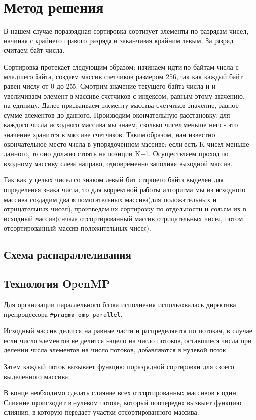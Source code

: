 \documentclass{report}
\begin{document}
\newpage

\section*{Метод решения}
В нашем случае поразрядная сортировка сортирует элементы по разрядам чисел, начиная с крайнего правого разряда и заканчивая крайним левым. За разряд считаем байт числа.
\par Сортировка протекает следующим образом: начинаем идти по байтам числа с младшего байта, создаем массив счетчиков размером 256, так как каждый байт равен числу от 0 до 255. Смотрим значение текущего байта числа и и увеличиваем элемент в массиве счетчиков с индексом, равным этому значению, на единицу. Далее присваиваем элементу массива счетчиков значение, равное сумме элементов до данного. Производим окончательную расстановку: для каждого числа исходного массива мы знаем, сколько чисел меньше него - это значение хранится в массиве счетчиков. Таким образом, нам известно окончательное место числа в упорядоченном массиве: если есть K чисел меньше данного, то оно должно стоять на позиции K+1. Осуществляем проход по входному массиву слева направо, одновременно заполняя выходной массив.
\par Так как у целых чисел со знаком левый бит старшего байта выделен для определения знака числа, то для корректной работы алгоритма мы из исходного массива создадим два вспомогательных массива(для положительных и отрицательных чисел), произведем их сортировку по отдельности и сольем их в исходный массив(снчала отсортированный массив отрицательных чисел, потом отсортированный массив положительных чисел).
\newpage
\begin{center}\section*{Схема распараллеливания}\end{center}
\subsection*{Технология OpenMP}
Для организации параллельного блока исполнения использовалась директива препроцессора \verb|#pragma omp parallel|.
\par Исходный массив делится на равные части и распределяется по потокам, в случае если число элементов не делится нацело на число потоков, оставшиеся числа при делении числа элементов на число потоков, добавляются в нулевой поток.
\par Затем каждый поток вызывает функцию поразрядной сортировки для своего выделенного массива.
\par В конце необходимо сделать слияние всех отсортированных массивов в один. Слияние происходит в нулевом потоке, который поочередно вызвыет функцию слияния, в которую передает участки отсортированного массива.
\end{document}
